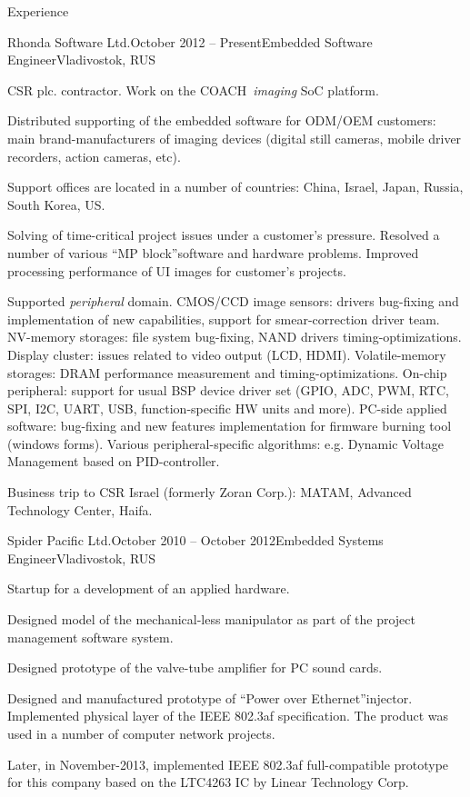 \documentclass{template}
\begin{document}
\begin{rSection}{Experience}

\begin{rCompany}{Rhonda Software Ltd.}{October 2012 -- Present}{Embedded Software Engineer}{Vladivostok, RUS}
\item CSR plc. contractor. Work on the COACH\texttrademark \ \textit{imaging} SoC platform.
\item Distributed supporting of the embedded software for ODM/OEM customers: main brand-manufacturers of imaging devices (digital still cameras, mobile driver recorders, action cameras, etc).
\item Support offices are located in a number of countries: China, Israel, Japan, Russia, South Korea, US.
\item Solving of time-critical project issues under a customer's pressure. Resolved a number of various \textquotedblleft MP block\textquotedblright software and hardware problems. Improved processing performance of UI images for customer's projects.
\item Supported \textit{peripheral} domain. CMOS/CCD image sensors: drivers bug-fixing and implementation of new capabilities, support for smear-correction driver team. NV-memory storages: file system bug-fixing, NAND drivers timing-optimizations. Display cluster: issues related to video output (LCD, HDMI). Volatile-memory storages: DRAM performance measurement and timing-optimizations. On-chip peripheral: support for usual BSP device driver set (GPIO, ADC, PWM, RTC, SPI, I2C, UART, USB, function-specific HW units and more). PC-side applied software: bug-fixing and new features implementation for firmware burning tool (windows forms). Various peripheral-specific algorithms: e.g. Dynamic Voltage Management based on PID-controller.
\item Business trip to CSR Israel (formerly Zoran Corp.): MATAM, Advanced Technology Center, Haifa.
\end{rCompany}

\begin{rCompany}{Spider Pacific Ltd.}{October 2010 -- October 2012}{Embedded Systems Engineer}{Vladivostok, RUS}
\item Startup for a development of an applied hardware.
\item Designed model of the mechanical-less manipulator as part of the project management software system.
\item Designed prototype of the valve-tube amplifier for PC sound cards.
\item Designed and manufactured prototype of \textquotedblleft Power over Ethernet\textquotedblright injector. Implemented physical layer of the IEEE 802.3af specification. The product was used in a number of computer network projects.
\item Later, in November-2013, implemented IEEE 802.3af full-compatible prototype for this company based on the LTC4263 IC by Linear Technology Corp.
\end{rCompany}

\end{rSection}
\end{document}
